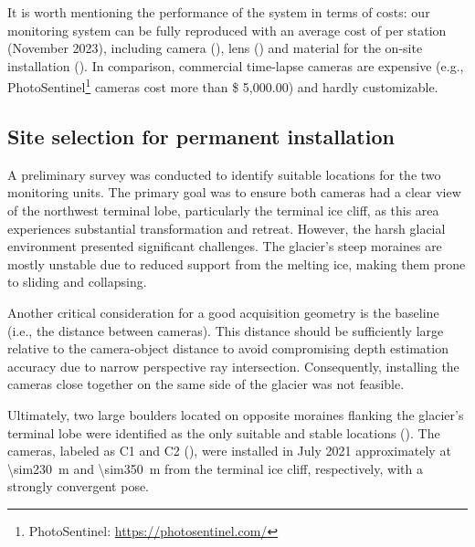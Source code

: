 It is worth mentioning the performance of the system in terms of costs: our monitoring system can be fully reproduced with an average cost of  per station (November 2023), including camera (), lens () and material for the on-site installation ().
In comparison, commercial time-lapse cameras are expensive (e.g., PhotoSentinel\footnote{PhotoSentinel: \url{https://photosentinel.com/}} cameras cost more than \$ 5,000.00) and hardly customizable. 

\subsection{Site selection for permanent installation}\label{sec:4:siteselection}

A preliminary survey was conducted to identify suitable locations for the two monitoring units. 
The primary goal was to ensure both cameras had a clear view of the northwest terminal lobe, particularly the terminal ice cliff,
as this area experiences substantial transformation and retreat. 
However, the harsh glacial environment presented significant challenges. 
The glacier's steep moraines are mostly unstable due to reduced support from the melting ice, making them prone to sliding and collapsing.

Another critical consideration for a good acquisition geometry is the baseline (i.e., the distance between cameras). 
This distance should be sufficiently large relative to the camera-object distance to avoid compromising depth estimation accuracy due to narrow perspective ray intersection. 
Consequently, installing the cameras close together on the same side of the glacier was not feasible.

Ultimately, two large boulders located on opposite moraines flanking the glacier's terminal lobe were identified as the only suitable and stable locations ().
The cameras, labeled as C1 and C2 (), were installed in July 2021 approximately at \SI{\sim230}{\meter} and \SI{\sim350}{\meter} from the terminal ice cliff, respectively, with a strongly convergent pose.

